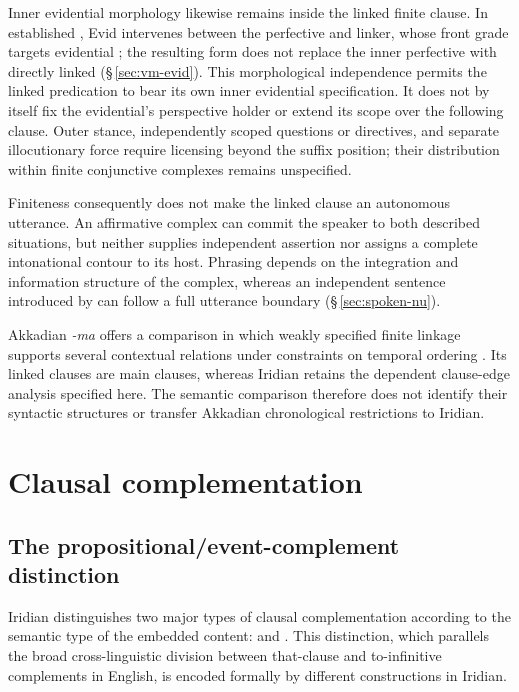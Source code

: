Inner evidential morphology likewise remains inside the linked finite clause.
In established , Evid intervenes between the perfective and
linker, whose front grade targets evidential ; the resulting form does
not replace the inner perfective with directly linked 
(§\,\ref{sec:vm-evid}). This morphological independence permits the linked
predication to bear its own inner evidential specification. It does not by
itself fix the evidential's perspective holder or extend its scope over the
following clause. Outer stance, independently scoped questions or directives,
and separate illocutionary force require licensing beyond the suffix position;
their distribution within finite conjunctive complexes remains unspecified.

Finiteness consequently does not make the linked clause an autonomous
utterance. An affirmative complex can commit the speaker to both described
situations, but  neither supplies independent assertion nor assigns
a complete intonational contour to its host. Phrasing depends on the
integration and information structure of the complex, whereas an independent
sentence introduced by  can follow a full utterance boundary
(§\,\ref{sec:spoken-nu}).

Akkadian \textit{-ma} offers a comparison in which weakly specified finite
linkage supports several contextual relations under constraints on temporal
ordering \cite[58--60]{deutscher2009}. Its linked clauses are main clauses,
whereas Iridian  retains the dependent clause-edge analysis specified
here. The semantic comparison therefore does not identify their syntactic
structures or transfer Akkadian chronological restrictions to Iridian.


\section{Clausal complementation}\label{sec:complementation}

\subsection{The propositional/event-complement distinction}
\label{sec:th-compl-distinction}

Iridian distinguishes two major types of clausal complementation according to
the semantic type of the embedded content: 
and . This distinction, which parallels the
broad cross-linguistic division between that-clause and to-infinitive
complements in English, is encoded formally by different constructions in
Iridian.

